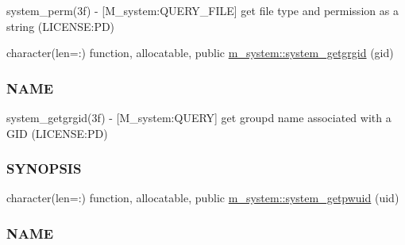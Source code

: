 \begin{DoxyCompactItemize}
\begin{DoxyCompactList}
system\+\_\+perm(3f) -\/ \mbox{[}M\+\_\+system\+:Q\+U\+E\+R\+Y\+\_\+\+F\+I\+LE\mbox{]} get file type and permission as a string (L\+I\+C\+E\+N\+SE\+:PD) \end{DoxyCompactList}\item 
character(len=\+:) function, allocatable, public \mbox{\hyperlink{namespacem__system_aec137429fbb8c848db4ecd914466d7e8}{m\+\_\+system\+::system\+\_\+getgrgid}} (gid)
\begin{DoxyCompactList}\small\item\em \subsubsection*{N\+A\+ME}

system\+\_\+getgrgid(3f) -\/ \mbox{[}M\+\_\+system\+:Q\+U\+E\+RY\mbox{]} get groupd name associated with a G\+ID (L\+I\+C\+E\+N\+SE\+:PD) \subsubsection*{S\+Y\+N\+O\+P\+S\+IS}\end{DoxyCompactList}\item 
character(len=\+:) function, allocatable, public \mbox{\hyperlink{namespacem__system_a59cd13de95dc9a65b444f02614ea39ce}{m\+\_\+system\+::system\+\_\+getpwuid}} (uid)
\begin{DoxyCompactList}\small\item\em \subsubsection*{N\+A\+ME}


\end{DoxyCompactList}
\end{DoxyCompactItemize}
